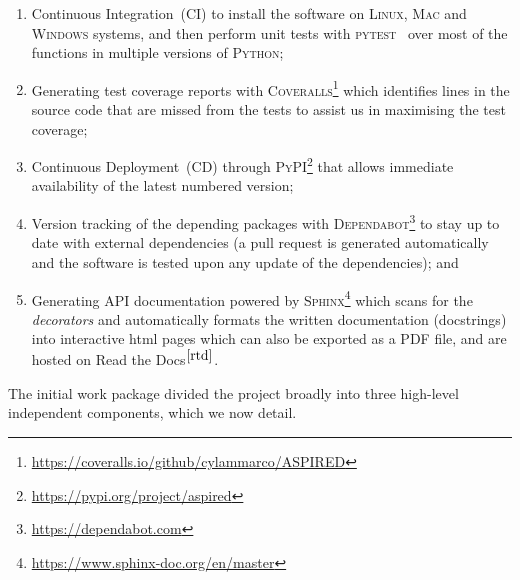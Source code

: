 \documentclass[linenumbers, twocolumn]{aastex631}
\begin{document}
\begin{enumerate}
    \item Continuous Integration~(CI) to install the software on \textsc{Linux},
    \textsc{Mac} and \textsc{Windows} systems, and then perform unit tests with
    \textsc{pytest}~\citep{pytest6.2} over most of the functions in multiple
    versions of \textsc{Python};
    \item Generating test coverage reports with \textsc{Coveralls}\footnote{\url{    https://coveralls.io/github/cylammarco/ASPIRED}} which identifies lines in
    the source code that are missed from the tests to assist us in maximising the test coverage;
    \item Continuous Deployment~(CD) through \textsc{PyPI}\footnote{\url{https://pypi.org/project/aspired}} that allows immediate availability of the
    latest numbered version;
    \item Version tracking of the depending packages with 
    \textsc{Dependabot}\footnote{\url{https://dependabot.com}} to stay up to date with external dependencies (a
    pull request is generated automatically and the software is
    tested upon any update of the dependencies); and
    \item Generating API documentation powered by \textsc{Sphinx}\footnote{\url{https://www.sphinx-doc.org/en/master}} which scans for the \textit{decorators}
    and automatically formats the written documentation (docstrings) into
    interactive html pages which can also be exported as a PDF file, and are
    hosted on Read the Docs$^{\ref{rtd}}$.
\end{enumerate}

The initial work package divided the project broadly into three high-level
independent components, which we now detail.

\end{document}
